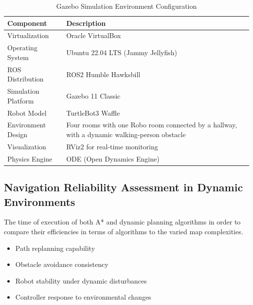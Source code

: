 \begin{table}[H]
	\centering
	\caption{Gazebo Simulation Environment Configuration}
	\label{tab:gazebo_configuration_p5}
	\begin{tabular}{|p{3.5cm}|p{10cm}|}
		\hline
		\textbf{Component} & \textbf{Description} \\
		\hline
		Virtualization & Oracle VirtualBox \\
		\hline
		Operating System & Ubuntu 22.04 LTS (Jammy Jellyfish) \\
		\hline
		ROS Distribution & ROS2 Humble Hawksbill \\
		\hline
		Simulation Platform & Gazebo 11 Classic \\
		\hline
		Robot Model & TurtleBot3 Waffle \\
		\hline
		Environment Design & Four rooms with one Robo room connected by a hallway, with a dynamic walking-person obstacle \\
		\hline
		Visualization & RViz2 for real-time monitoring \\
		\hline
		Physics Engine & ODE (Open Dynamics Engine) \\
		\hline
	\end{tabular}
\end{table}


\subsection{Navigation Reliability Assessment in Dynamic Environments}

The time of execution of both A* and dynamic planning algorithms in order to compare their efficiencies in terms of algorithms to the varied map complexities.

\begin{itemize}[noitemsep]
	\item Path replanning capability
	\item Obstacle avoidance consistency
	\item Robot stability under dynamic disturbances
	\item Controller response to environmental changes
\end{itemize}


